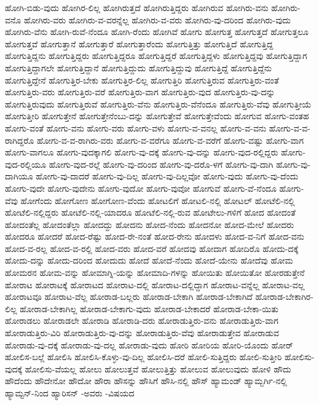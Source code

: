 {ಹೋಗಿ-ಬಿಡು-ವುದು
ಹೋಗಿರ-ಲಿಲ್ಲ
ಹೋಗಿರುತ್ತದೆ
ಹೋಗಿರುತ್ತಿದ್ದರು
ಹೋಗಿರುವ
ಹೋಗಿರು-ವನು
ಹೋಗಿರು-ವನೊ
ಹೋಗಿರು-ವರು
ಹೋಗಿರು-ವ-ವರನ್ನೆಲ್ಲ
ಹೋಗಿರು-ವ-ವರು
ಹೋಗಿರು-ವು-ದರಿಂದ
ಹೋಗಿರು-ವುದು
ಹೋಗಿರು-ವೆನು
ಹೋಗಿ-ರುವೆ-ನೆಂದೂ
ಹೋಗಿ-ರೆಂದು
ಹೋಗಿವೆ
ಹೋಗು
ಹೋಗುತ್ತ
ಹೋಗುತ್ತದೆ
ಹೋಗುತ್ತಲೂ
ಹೋಗುತ್ತವೆ
ಹೋಗುತ್ತಾನೆ
ಹೋಗುತ್ತಾರೆ
ಹೋಗುತ್ತಾರೆಂದು
ಹೋಗುತ್ತಿತ್ತು
ಹೋಗುತ್ತಿದೆ
ಹೋಗುತ್ತಿದ್ದ
ಹೋಗುತ್ತಿದ್ದನು
ಹೋಗುತ್ತಿದ್ದರು
ಹೋಗುತ್ತಿದ್ದರೂ
ಹೋಗುತ್ತಿದ್ದರೆ
ಹೋಗುತ್ತಿದ್ದಳು
ಹೋಗುತ್ತಿದ್ದವು
ಹೋಗುತ್ತಿದ್ದಾಗ
ಹೋಗುತ್ತಿದ್ದಾಗಲೇ
ಹೋಗುತ್ತಿದ್ದಾನೆ
ಹೋಗುತ್ತಿದ್ದುದು
ಹೋಗುತ್ತಿದ್ದುವು
ಹೋಗುತ್ತಿದ್ದೆ
ಹೋಗುತ್ತಿದ್ದೆನು
ಹೋಗುತ್ತಿದ್ದೇನೆ
ಹೋಗುತ್ತಿರ-ಬೇಕು
ಹೋಗುತ್ತಿರ-ಲಿಲ್ಲ
ಹೋಗುತ್ತಿರಿ
ಹೋಗುತ್ತಿರುವ
ಹೋಗುತ್ತಿರು-ವಂತೆ
ಹೋಗುತ್ತಿರು-ವರು
ಹೋಗುತ್ತಿರು-ವರೆ
ಹೋಗುತ್ತಿರು-ವಾಗ
ಹೋಗುತ್ತಿರು-ವುದ
ಹೋಗುತ್ತಿರು-ವು-ದನ್ನು
ಹೋಗುತ್ತಿರುವುದು
ಹೋಗುತ್ತಿರುವೆ
ಹೋಗುತ್ತಿರು-ವೆನು
ಹೋಗುತ್ತಿರು-ವೆನೆಂದೂ
ಹೋಗುತ್ತಿರು-ವೆವು
ಹೋಗುತ್ತೀಯೆ
ಹೋಗುತ್ತೀರಿ
ಹೋಗುತ್ತೇನೆ
ಹೋಗುತ್ತೇನೆಂಬು-ದನ್ನು
ಹೋಗುತ್ತೇವೆ
ಹೋಗುತ್ತೇವೆಂದು
ಹೋಗುವ
ಹೋಗು-ವಂತಹ
ಹೋಗು-ವಂತೆ
ಹೋಗು-ವನು
ಹೋಗು-ವರು
ಹೋಗು-ವಳು
ಹೋಗು-ವ-ವನಲ್ಲ
ಹೋಗು-ವ-ವನು
ಹೋಗು-ವ-ವ-ರಾಗಿದ್ದರೊ
ಹೋಗು-ವ-ವ-ರಾಗಿರು-ವರು
ಹೋಗು-ವ-ವರೆಗೂ
ಹೋಗು-ವ-ವರೆಗೆ
ಹೋಗು-ವಷ್ಟು
ಹೋಗು-ವಾಗ
ಹೋಗು-ವಾಗಲೂ
ಹೋಗು-ವುದಕ್ಕಾಗಲಿ
ಹೋಗು-ವು-ದಕ್ಕೆ
ಹೋಗು-ವು-ದನ್ನು
ಹೋಗು-ವುದ-ರಲ್ಲಿದ್ದರು
ಹೋಗು-ವುದ-ರಲ್ಲಿಯೂ
ಹೋಗು-ವುದ-ರಲ್ಲೆ
ಹೋಗು-ವು-ದರಿಂದ
ಹೋಗು-ವು-ದರೊ-ಳಗೆ
ಹೋಗು-ವು-ದಾಗಿ
ಹೋಗು-ವು-ದಾಗಿಯೂ
ಹೋಗು-ವು-ದಾದರೆ
ಹೋಗು-ವು-ದಿಲ್ಲ
ಹೋಗು-ವು-ದಿಲ್ಲವೋ
ಹೋಗು-ವುದು
ಹೋಗು-ವು-ದೆಂದು
ಹೋಗು-ವುದೇ
ಹೋಗು-ವುದೇನು
ಹೋಗು-ವುದೋ
ಹೋಗು-ವುವೋ
ಹೋಗುವೆ
ಹೋಗು-ವೆ-ನೆಂದೂ
ಹೋಗು-ವೆವು
ಹೋಗೆಂದು
ಹೋಗೋಣ
ಹೋಗೋಣ-ವೆಂದು
ಹೋಟಲಿಗೆ
ಹೋಟಲಿ-ನಲ್ಲಿ
ಹೋಟಲ್
ಹೋಟೆಲಿ-ನಲ್ಲಿ
ಹೋಟೆಲಿ-ನಲ್ಲಿದ್ದರು
ಹೋಟೆಲಿ-ನಲ್ಲಿ-ಯಾದರೂ
ಹೋಟೆಲಿ-ನಲ್ಲಿ-ರುವ
ಹೋಟೇಲು-ಗಳಿಗೆ
ಹೋದ
ಹೋದಂತೆ
ಹೋದಂತೆಲ್ಲ
ಹೋದಂತೆಲ್ಲಾ
ಹೋದದ್ದು
ಹೋದನು
ಹೋದ-ನೆಂದು
ಹೋದನೋ
ಹೋದ-ಮೇಲೆ
ಹೋದರು
ಹೋದರೂ
ಹೋದರೆ
ಹೋದ-ರೆಷ್ಟು
ಹೋದ-ರೇ-ನಂತೆ
ಹೋದ-ರೇನು
ಹೋದಳು
ಹೋದ-ವ-ನಿಗೆ
ಹೋದ-ವನು
ಹೋದ-ವ-ರಲ್ಲ
ಹೋದ-ವ-ರಲ್ಲಿ
ಹೋದ-ವರು
ಹೋದ-ವರೆ
ಹೋದವು
ಹೋದಾಗ
ಹೋದಿರೊ
ಹೋದು-ದಕ್ಕೆ
ಹೋದು-ದನ್ನು
ಹೋದು-ದರಿಂದ
ಹೋದುದು
ಹೋದೆ
ಹೋದೆ-ನೆಂದು
ಹೋದೆ-ಯೇನು
ಹೋದೆವು
ಹೋಮ
ಹೋಮರನ
ಹೋಮ-ವನ್ನು
ಹೋಮಾಗ್ನಿ-ಯನ್ನು
ಹೋಮಾದಿ-ಗಳನ್ನು
ಹೋಯಿತು
ಹೋಯಿತೋ
ಹೋರಡುತ್ತೇನೆ
ಹೋರಾಟ
ಹೋರಾಟಕ್ಕೆ
ಹೋರಾಟದ
ಹೋರಾಟ-ದಲ್ಲಿ
ಹೋರಾಟ-ದಲ್ಲಿದ್ದಾಗ
ಹೋರಾಟ-ವನ್ನೆಲ್ಲ
ಹೋರಾಟ-ವಲ್ಲ
ಹೋರಾಟವೂ
ಹೋರಾಟ-ವೆಲ್ಲ
ಹೋರಾಡ-ಬಲ್ಲರು
ಹೋರಾಡ-ಬೇಕಾಗಿ
ಹೋರಾಡ-ಬೇಕಾಗಿದೆ
ಹೋರಾಡ-ಬೇಕಾಗಿರ-ಲಿಲ್ಲ
ಹೋರಾಡ-ಬೇಕಾಗಿಲ್ಲ
ಹೋರಾಡ-ಬೇಕಾಗು-ವುದು
ಹೋರಾಡ-ಬೇಕಾದರೆ
ಹೋರಾಡ-ಬೇಕಾ-ಯಿತು
ಹೋರಾಡಲು
ಹೋರಾಡಲೇ
ಹೋರಾಡಿ
ಹೋರಾಡಿ-ದರು
ಹೋರಾಡುತ್ತಿರು-ವನು
ಹೋರಾಡುತ್ತಿರು-ವಾಗ
ಹೋರಾಡುತ್ತಿರು-ವಿರಿ
ಹೋರಾಡುತ್ತಿರು-ವು-ದನ್ನು
ಹೋರಾಡುತ್ತಿರು-ವೆವು
ಹೋರಾಡುತ್ತೇವ
ಹೋರಾಡುವ
ಹೋರಾಡು-ವು-ದಕ್ಕೆ
ಹೋರಾಡು-ವು-ದಲ್ಲ
ಹೋರಾಡು-ವುದು
ಹೋರಿ
ಹೋರಿಯ
ಹೋರಿ-ಯೊಂದು
ಹೋರ್
ಹೋಲಿಸ-ಬಲ್ಲೆ
ಹೋಲಿಸಿ
ಹೋಲಿಸಿ-ಕೊಳ್ಳು-ವು-ದಿಲ್ಲ
ಹೋಲಿಸಿ-ದರೆ
ಹೋಲಿ-ಸುತ್ತಿದ್ದರು
ಹೋಲಿ-ಸುತ್ತೀರಿ
ಹೋಲಿಸು-ವುದಕ್ಕೆ
ಹೋಲಿಸು-ವೆಯಲ್ಲ
ಹೋಲು
ಹೋಲುತ್ತವೆ
ಹೋಲುತ್ತಿತ್ತು
ಹೋಲುವ
ಹೋಲುವುದು
ಹೋಳಿ
ಹೌದು
ಹೌದೆಂದು
ಹೌದೇನೋ
ಹೌದೋ
ಹೌರಾ
ಹೌಸನ್ನು
ಹೌಸಿಗೆ
ಹೌಸಿ-ನಲ್ಲಿ
ಹೌಸ್
ಹ್ಯಾಮಂಡ್
ಹ್ಯಾಮ್ಬರ್ಗಿ-ನಲ್ಲಿ
ಹ್ಯಾಮ್ಟನ್-ನಿಂದ
ಹ್ಯಾರಿಸನ್
-ಅವರು
-ವಿಷಯದ
}
